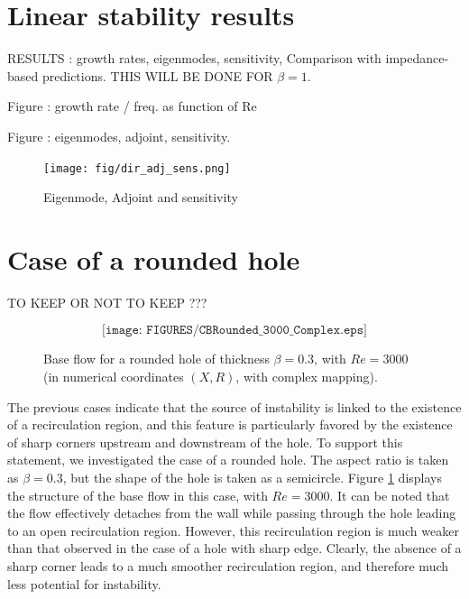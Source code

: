 \documentclass{jfm}
\begin{document}
\section{Linear stability results}

RESULTS : growth rates, eigenmodes, sensitivity,  Comparison with impedance-based predictions. THIS WILL BE DONE FOR $\beta = 1$.



Figure : growth rate / freq. as function of Re

Figure : eigenmodes, adjoint,  sensitivity.

\begin{figure}
\texttt{[image: fig/dir\_adj\_sens.png]}
\caption{ Eigenmode, Adjoint and sensitivity}
\end{figure}


\clearpage

\section{Case of a rounded hole}

TO KEEP OR NOT TO KEEP ???



\begin{figure}
$$
\texttt{[image: FIGURES/CBRounded\_3000\_Complex.eps]}
$$
\caption{Base flow for a rounded hole of thickness $\beta = 0.3$, with $Re = 3000$ 
(in numerical coordinates $(X,R)$, with complex mapping). 
}
\label{fig:chbase_C}
\end{figure}



The previous cases indicate that the source of instability is linked to the existence of a recirculation region, and this feature is particularly favored by the existence of sharp corners upstream and downstream of the hole. To support this statement, we investigated the case of a rounded hole. The aspect ratio is taken as $\beta=0.3$, but 
the shape of the hole is taken as a semicircle. Figure \ref{fig:chbase_C} displays the structure of the base flow in this case, with $Re = 3000$. It can be noted that the flow effectively detaches from the wall while passing through the hole leading to an open recirculation region. However, this recirculation region is much weaker than that observed in the case of a hole with sharp edge. Clearly, the absence of a sharp corner leads to a much smoother recirculation region, and therefore much less potential for instability.
\end{document}
